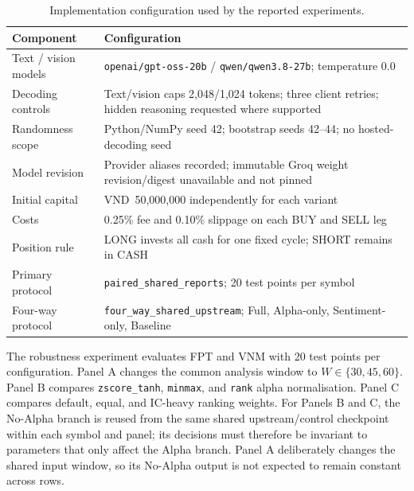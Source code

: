 \begin{table}[H]
\centering
\caption{Implementation configuration used by the reported experiments.}
\label{tab:implementation_details}
\renewcommand{\arraystretch}{1.16}
\begin{tabularx}{\textwidth}{|l|X|}
\hline
\textbf{Component} & \textbf{Configuration} \\
\hline
Text / vision models & \texttt{openai/gpt-oss-20b} / \texttt{qwen/qwen3.8-27b}; temperature $0.0$ \\
\hline
Decoding controls & Text/vision caps 2,048/1,024 tokens; three client retries; hidden reasoning requested where supported \\
\hline
Randomness scope & Python/NumPy seed 42; bootstrap seeds 42--44; no hosted-decoding seed \\
\hline
Model revision & Provider aliases recorded; immutable Groq weight revision/digest unavailable and not pinned \\
\hline
Initial capital & VND~50,000,000 independently for each variant \\
\hline
Costs & 0.25\% fee and 0.10\% slippage on each BUY and SELL leg \\
\hline
Position rule & LONG invests all cash for one fixed cycle; SHORT remains in CASH \\
\hline
Primary protocol & \texttt{paired\_shared\_reports}; 20 test points per symbol \\
\hline
Four-way protocol & \texttt{four\_way\_shared\_upstream}; Full, Alpha-only, Sentiment-only, Baseline \\
\hline
\end{tabularx}
\end{table}

The robustness experiment evaluates FPT and VNM with 20 test points per configuration. Panel A changes the common analysis window to $W\in\{30,45,60\}$. Panel B compares \texttt{zscore\_tanh}, \texttt{minmax}, and \texttt{rank} alpha normalisation. Panel C compares default, equal, and IC-heavy ranking weights. For Panels B and C, the No-Alpha branch is reused from the same shared upstream/control checkpoint within each symbol and panel; its decisions must therefore be invariant to parameters that only affect the Alpha branch. Panel A deliberately changes the shared input window, so its No-Alpha output is not expected to remain constant across rows.
